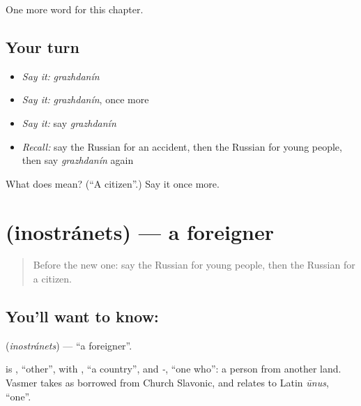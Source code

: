 \begin{grammarlens}[title={What you've built}]
One more word for this chapter.
\end{grammarlens}

\subsection*{Your turn}
\begin{itemize}
\raggedright
  \item \emph{Say it:} \emph{grazhdanín}
  \item \emph{Say it:} \emph{grazhdanín}, once more
  \item \emph{Say it:} say \emph{grazhdanín}
  \item \emph{Recall:} say the Russian for an accident, then the Russian for young people, then say \emph{grazhdanín} again
\end{itemize}

\begin{tcolorbox}[breakable,colback=teal!4,colframe=teal!35!black,title={Before you move on}]
What does  mean? (\textquotedblleft{}A citizen\textquotedblright{}.) Say it once more.
\end{tcolorbox}
\section[\texorpdfstring{\ru{иностранец} (inostránets)}{иностранец (inostránets)}]{ (inostránets) — a foreigner}

\label{lesson:RU-C199-inostranets}



\begin{quote}
Before the new one: say the Russian for young people, then the Russian for a citizen.
\end{quote}

\subsection*{You'll want to know: }
\textbf{} (\emph{inostránets}) — \textquotedblleft{}a foreigner\textquotedblright{}.

\begin{cousinweb}
\textbf{} is \emph{}, \textquotedblleft{}other\textquotedblright{}, with \emph{}, \textquotedblleft{}a country\textquotedblright{}, and \emph{-}, \textquotedblleft{}one who\textquotedblright{}: a person from another land. Vasmer takes \emph{} as borrowed from Church Slavonic, and relates \emph{} to Latin \emph{ūnus}, \textquotedblleft{}one\textquotedblright{}.
\end{cousinweb}


